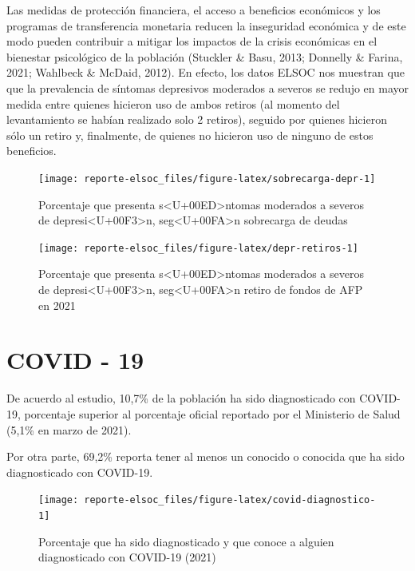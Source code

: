 \documentclass[
  12pt,
]{book}
\begin{document}
Las medidas de protección financiera, el acceso a beneficios económicos y los programas de transferencia monetaria reducen la inseguridad económica y de este modo pueden contribuir a mitigar los impactos de la crisis económicas en el bienestar psicológico de la población (Stuckler \& Basu, 2013; Donnelly \& Farina, 2021; Wahlbeck \& McDaid, 2012). En efecto, los datos ELSOC nos muestran que que la prevalencia de síntomas depresivos moderados a severos se redujo en mayor medida entre quienes hicieron uso de ambos retiros (al momento del levantamiento se habían realizado solo 2 retiros), seguido por quienes hicieron sólo un retiro y, finalmente, de quienes no hicieron uso de ninguno de estos beneficios.

\begin{figure}

{\centering \texttt{[image: reporte-elsoc\_files/figure-latex/sobrecarga-depr-1]} 

}

\caption{Porcentaje que presenta s<U+00ED>ntomas moderados a severos de depresi<U+00F3>n, seg<U+00FA>n sobrecarga de deudas}\label{fig:sobrecarga-depr}
\end{figure}

\begin{figure}

{\centering \texttt{[image: reporte-elsoc\_files/figure-latex/depr-retiros-1]} 

}

\caption{Porcentaje que presenta s<U+00ED>ntomas moderados a severos de depresi<U+00F3>n, seg<U+00FA>n retiro de fondos de AFP en 2021}\label{fig:depr-retiros}
\end{figure}

\hypertarget{covid---19}{%
\section{COVID - 19}\label{covid---19}}

De acuerdo al estudio, 10,7\% de la población ha sido diagnosticado con COVID-19, porcentaje superior al porcentaje oficial reportado por el Ministerio de Salud (5,1\% en marzo de 2021).

Por otra parte, 69,2\% reporta tener al menos un conocido o conocida que ha sido diagnosticado con COVID-19.

\begin{figure}

{\centering \texttt{[image: reporte-elsoc\_files/figure-latex/covid-diagnostico-1]} 

}

\caption{Porcentaje que ha sido diagnosticado y que conoce a alguien diagnosticado con COVID-19 (2021)}\label{fig:covid-diagnostico}
\end{figure}
\end{document}
